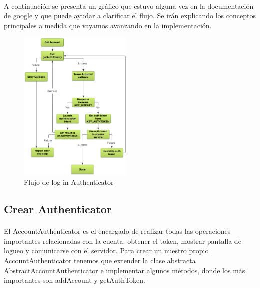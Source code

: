 \documentclass[10pt]{extarticle}
\begin{document}
\paragraph{}
A continuación se presenta un gráfico que estuvo alguna vez en la documentación de google y que puede ayudar a clarificar el flujo. Se irán explicando los conceptos principales a medida que vayamos avanzando en la implementación.

\begin{figure}[H]
    \centering
    \includegraphics[width=0.48\textwidth]{flujo_authenticator.png}
    \caption{Flujo de log-in Authenticator}
    \label{fig:flujo_authenticator}
\end{figure}

\subsection{Crear Authenticator}

\paragraph{}
El AccountAuthenticator es el encargado de realizar todas las operaciones importantes relacionadas con la cuenta: obtener el token, mostrar pantalla de logueo y comunicarse con el servidor. Para crear un nuestro propio AccountAuthenticator tenemos que extender la clase abstracta AbstractAccountAuthenticator e implementar algunos métodos, donde los más importantes son addAccount y getAuthToken.
\end{document}
